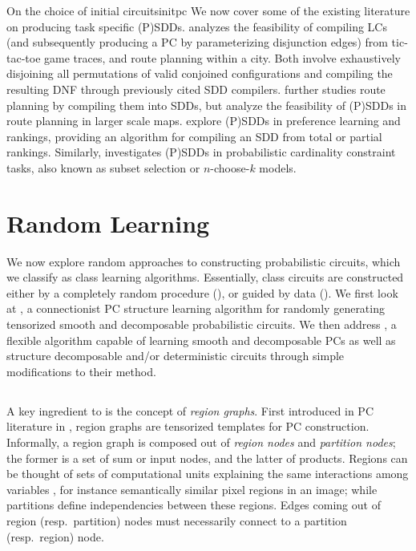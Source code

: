 \begin{remark}[breakable]{On the choice of initial circuits}{initpc}
  We now cover some of the existing literature on producing task specific (P)SDDs. \citet{choi16}
  analyzes the feasibility of compiling LCs (and subsequently producing a PC by parameterizing
  disjunction edges) from tic-tac-toe game traces, and route planning within a city. Both involve
  exhaustively disjoining all permutations of valid conjoined configurations and compiling the
  resulting DNF through previously cited SDD compilers. \citet{choi17} further studies route
  planning by compiling them into SDDs, but analyze the feasibility of (P)SDDs in route planning in
  larger scale maps. \citet{choi15} explore (P)SDDs in preference learning and rankings, providing
  an algorithm for compiling an SDD from total or partial rankings. Similarly, \citet{shen17}
  investigates (P)SDDs in probabilistic cardinality constraint tasks, also known as subset
  selection or $n$-choose-$k$ models.
\end{remark}

\section{Random Learning}
\label{sec:random}

We now explore random approaches to constructing probabilistic circuits, which we classify as
\randclass{} class learning algorithms. Essentially, \randclass{} class circuits are constructed
either by a completely random procedure (), or guided by data ().
We first look at  \citep{peharz20a}, a connectionist PC structure learning
algorithm for randomly generating tensorized smooth and decomposable probabilistic circuits. We
then address  \citep{dimauro21}, a flexible algorithm capable of learning smooth and
decomposable PCs as well as structure decomposable and/or deterministic circuits through simple
modifications to their method.

\subsection{}
\label{sec:ratspn}

A key ingredient to  \citep{peharz20a} is the concept of \emph{region graphs}.
First introduced in PC literature in \citet{dennis12}, region graphs are tensorized templates for
PC construction. Informally, a region graph is composed out of \emph{region nodes} and
\emph{partition nodes}; the former is a set of sum or input nodes, and the latter of products.
Regions can be thought of sets of computational units explaining the same interactions among
variables \citep{dennis12}, for instance semantically similar pixel regions in an image; while
partitions define independencies between these regions. Edges coming out of region (resp.\
partition) nodes must necessarily connect to a partition (resp.\ region) node.

